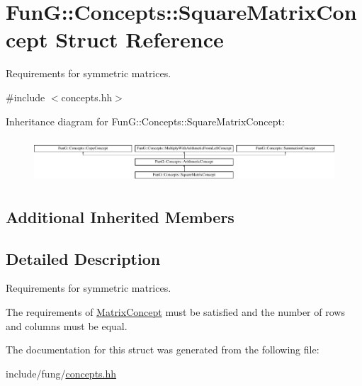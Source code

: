 \hypertarget{structFunG_1_1Concepts_1_1SquareMatrixConcept}{\section{Fun\-G\-:\-:Concepts\-:\-:Square\-Matrix\-Concept Struct Reference}
\label{structFunG_1_1Concepts_1_1SquareMatrixConcept}
}


Requirements for symmetric matrices.  




{\ttfamily \#include $<$concepts.\-hh$>$}

Inheritance diagram for Fun\-G\-:\-:Concepts\-:\-:Square\-Matrix\-Concept\-:\begin{figure}[H]
\begin{center}
\leavevmode
\includegraphics[height=1.661721cm]{structFunG_1_1Concepts_1_1SquareMatrixConcept}
\end{center}
\end{figure}
\subsection*{Additional Inherited Members}


\subsection{Detailed Description}
Requirements for symmetric matrices. 

The requirements of \hyperlink{structFunG_1_1Concepts_1_1MatrixConcept}{Matrix\-Concept} must be satisfied and the number of rows and columns must be equal. 

The documentation for this struct was generated from the following file\-:\begin{DoxyCompactItemize}
\item 
include/fung/\hyperlink{concepts_8hh}{concepts.\-hh}\end{DoxyCompactItemize}
